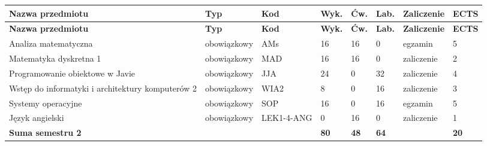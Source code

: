 \documentclass[12pt,a4paper]{article}
\newcommand{\thdrule}{\noalign{\global\setlength{\extrarowheight}{0pt}}}
\newcommand{\thdend}{\noalign{\global\setlength{\extrarowheight}{4pt}}}
\begin{document}
{\scriptsize
\begin{longtable}{>{\RaggedRight}m{5.0cm}m{1.9cm}m{0.75cm}m{0.85cm}m{0.85cm}m{0.85cm}m{1.45cm}m{0.9cm}}
\thdrule\toprule
\rowcolor{pjatkRed}
{\color{white}\footnotesize\textbf{\vphantom{Ag}Nazwa przedmiotu}} & {\color{white}\footnotesize\textbf{\vphantom{Ag}Typ}} & {\color{white}\footnotesize\textbf{\vphantom{Ag}Kod}} & {\color{white}\footnotesize\textbf{\vphantom{Ag}Wyk.}} & {\color{white}\footnotesize\textbf{\vphantom{Ag}Ćw.}} & {\color{white}\footnotesize\textbf{\vphantom{Ag}Lab.}} & {\color{white}\footnotesize\textbf{\vphantom{Ag}Zaliczenie}} & {\color{white}\footnotesize\textbf{\vphantom{Ag}ECTS}} \\
\midrule\thdend
\endfirsthead
\thdrule\toprule
\rowcolor{pjatkRed}
{\color{white}\footnotesize\textbf{\vphantom{Ag}Nazwa przedmiotu}} & {\color{white}\footnotesize\textbf{\vphantom{Ag}Typ}} & {\color{white}\footnotesize\textbf{\vphantom{Ag}Kod}} & {\color{white}\footnotesize\textbf{\vphantom{Ag}Wyk.}} & {\color{white}\footnotesize\textbf{\vphantom{Ag}Ćw.}} & {\color{white}\footnotesize\textbf{\vphantom{Ag}Lab.}} & {\color{white}\footnotesize\textbf{\vphantom{Ag}Zaliczenie}} & {\color{white}\footnotesize\textbf{\vphantom{Ag}ECTS}} \\
\midrule\thdend
\endhead
\rowcolor{tableRowLight} Analiza matematyczna & {\scriptsize obowiązkowy} & AMs & 16 & 16 & 0 & {\scriptsize egzamin} & 5 \\
\rowcolor{tableRowAlt} Matematyka dyskretna 1 & {\scriptsize obowiązkowy} & MAD & 16 & 16 & 0 & {\scriptsize zaliczenie} & 2 \\
\rowcolor{tableRowLight} Programowanie obiektowe w Javie & {\scriptsize obowiązkowy} & JJA & 24 & 0 & 32 & {\scriptsize zaliczenie} & 4 \\
\rowcolor{tableRowAlt} Wstęp do informatyki i architektury komputerów 2 & {\scriptsize obowiązkowy} & WIA2 & 8 & 0 & 16 & {\scriptsize zaliczenie} & 3 \\
\rowcolor{tableRowLight} Systemy operacyjne & {\scriptsize obowiązkowy} & SOP & 16 & 0 & 16 & {\scriptsize egzamin} & 5 \\
\rowcolor{tableRowAlt} Język angielski & {\scriptsize obowiązkowy} & LEK1-4-ANG & 0 & 16 & 0 & {\scriptsize zaliczenie} & 1 \\
\midrule[\heavyrulewidth]
\rowcolor{tableSummary} \textbf{Suma semestru 2} & & & \textbf{80} & \textbf{48} & \textbf{64} & & \textbf{20} \\
\bottomrule
\end{longtable}}
\end{document}

